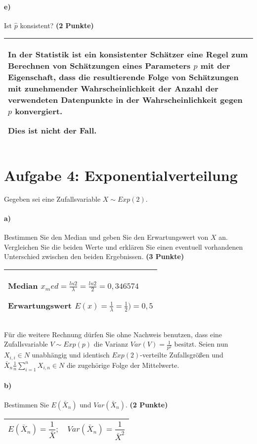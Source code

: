 \documentclass[10pt, a4paper]{article}
\begin{document}
\paragraph{e)} Ist $\hat{p}$ konsistent? \textbf{(2 Punkte)}\\
\begin{tabular}{| p{17cm} |}
    \hline
    In der Statistik ist ein konsistenter Schätzer eine Regel zum Berechnen von Schätzungen eines Parameters $p$ mit der Eigenschaft, dass die resultierende Folge von Schätzungen mit zunehmender Wahrscheinlichkeit der Anzahl der verwendeten Datenpunkte in der Wahrscheinlichkeit gegen $p$ konvergiert.

    Dies ist nicht der Fall.
    \\\hline
\end{tabular}

\section{Aufgabe 4: Exponentialverteilung}
Gegeben sei eine Zufallsvariable $X \sim Exp(2)$.
\paragraph{a)} Bestimmen Sie den Median und geben Sie den Erwartungswert von $X$ an. Vergleichen Sie die beiden Werte und erklären Sie einen eventuell vorhandenen Unterschied zwischen den beiden Ergebnissen. \textbf{(3 Punkte)}\\
\begin{tabular}{| p{17cm} |}
    \hline
    Median $x_med=\frac{ln 2}{\lambda}=\frac{ln 2}{2} = 0,346574$

    Erwartungswert $E(x)=\frac{1}{\lambda}= \frac{1}{2} ) = 0,5$
    \\\hline
\end{tabular}

Für die weitere Rechnung dürfen Sie ohne Nachweis benutzen, dass eine Zufallsvariable $V\sim Exp(p)$ die Varianz $Var(V) =\frac{1}{p^2}$ besitzt. Seien nun $X_{i,i}\in N$ unabhängig und identisch $Exp(2)$-verteilte Zufallsgrößen und $\bar{X}_n \frac{1}{n}\sum_{i=1}^{n} X_{i,n}\in N$ die zugehörige Folge der Mittelwerte.
\paragraph{b)} Bestimmen Sie $E(\bar{X}_n)$ und $Var(\bar{X}_n)$. \textbf{(2 Punkte)}\\
\begin{tabular}{| p{17cm} |}
    \hline
    $$E(\bar{X}_n) = \frac{1}{\bar{X}} ;\quad
        Var(\bar{X}_n) = \frac{1}{\bar{X}^2} $$
    \\\hline
\end{tabular}
\end{document}
